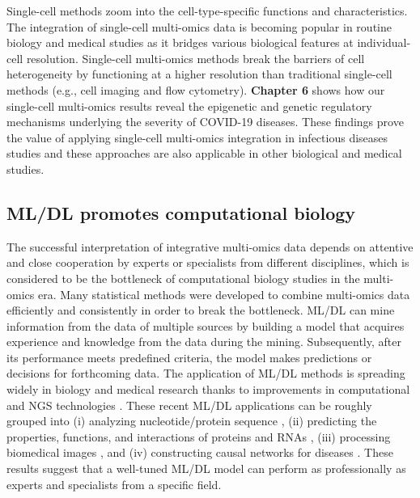 \documentclass{book}
\begin{document}
\begin{refsection}
Single-cell methods zoom into the cell-type-specific functions and characteristics.
The integration of single-cell multi-omics data is becoming popular in routine biology and medical studies as it bridges various biological features at individual-cell resolution.
Single-cell multi-omics methods break the barriers of cell heterogeneity by functioning at a higher resolution than traditional single-cell methods (e.g., cell imaging and flow cytometry).
\textbf{Chapter 6} shows how our single-cell multi-omics results reveal the epigenetic and genetic regulatory mechanisms underlying the severity of COVID-19 diseases.
These findings prove the value of applying single-cell multi-omics integration in infectious diseases studies and these approaches are also applicable in other biological and medical studies.

\subsection*{ML/DL promotes computational biology}
The successful interpretation of integrative multi-omics data depends on attentive and close cooperation by experts or specialists from different disciplines, which is considered to be the bottleneck of computational biology studies in the multi-omics era.
Many statistical methods were developed to combine multi-omics data efficiently and consistently in order to break the bottleneck.
ML/DL can mine information from the data of multiple sources by building a model that acquires experience and knowledge from the data during the mining.
Subsequently, after its performance meets predefined criteria, the model makes predictions or decisions for forthcoming data.
The application of ML/DL methods is spreading widely in biology and medical research thanks to improvements in computational and NGS technologies \cite{Whalen2021Navigating}.
These recent ML/DL applications can be roughly grouped into (i) analyzing nucleotide/protein sequence \cite{Yang2020Review,Jurtz2017An}, (ii) predicting the properties, functions, and interactions of proteins and RNAs \cite{Sun2017Sequence}, (iii) processing biomedical images \cite{Gröhl2021Deep}, and (iv) constructing causal networks for diseases \cite{Elmarakeby2021Biologically}.
These results suggest that a well-tuned ML/DL model can perform as professionally as experts and specialists from a specific field.


\end{refsection}
\end{document}
